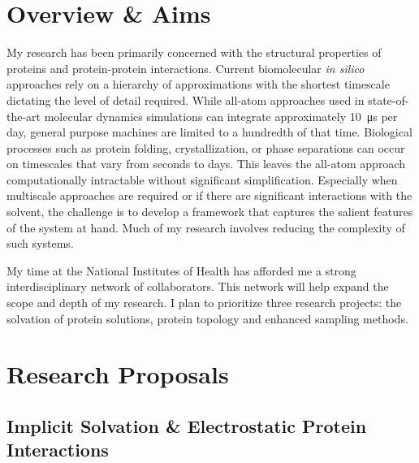 \documentclass[]{scrartcl}
\newcommand{\insetpicture}[1]{\marginpar{\texttt{[image: \#1]}}}
\begin{document}
\begin{cleanCV}

\section{Overview \& Aims}

My research has been primarily concerned with the structural properties of proteins and protein-protein interactions.
Current biomolecular \textit{in silico} approaches rely on a hierarchy of approximations with the shortest timescale dictating the level of detail required.
While all-atom approaches used in state-of-the-art molecular dynamics simulations can integrate approximately 
\SI{10}{\micro\second} per day, general purpose machines are limited to a hundredth of that time.
Biological processes such as protein folding, crystallization, or phase separations can occur on timescales that vary from seconds to days. 
This leaves the all-atom approach computationally intractable without significant simplification.
\insetpicture{research_images/1AO6_cartoon}
Especially when multiscale approaches are required or if there are significant interactions with the solvent, the challenge is to develop a framework that captures the salient features of the system at hand.
Much of my research involves reducing the complexity of such systems.

My time at the National Institutes of Health has afforded me a strong interdisciplinary network of collaborators.
This network will help expand the scope and depth of my research.
I plan to prioritize three research projects: the solvation of protein solutions, protein topology and enhanced sampling methods.

\section{Research Proposals}
\subsection{Implicit Solvation \& Electrostatic Protein Interactions}


\end{cleanCV}
\end{document}
